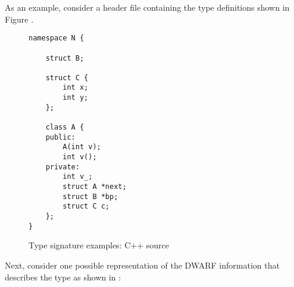 As an example, 
consider a  header file 
containing the type definitions shown
in Figure .

\begin{figure}[h]
\begin{lstlisting}
namespace N {

    struct B;

    struct C {
        int x;
        int y;
    };

    class A {
    public:
        A(int v);
        int v();
    private:
        int v_;
        struct A *next;
        struct B *bp;
        struct C c;
    };
}
\end{lstlisting}
\caption{Type signature examples: C++ source}
\label{fig:typesignatureexamplescsource}
\end{figure}

Next, consider one possible representation of the DWARF
information that describes the type  as shown
in 
:

